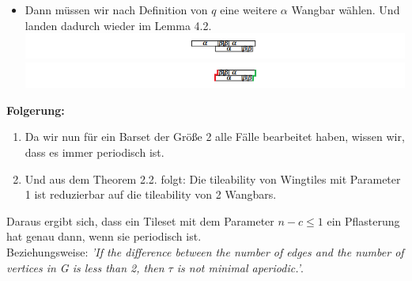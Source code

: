 \begin{itemize}
\begin{itemize}
        \item Dann müssen wir nach Definition von $q$ eine weitere $\alpha$ Wangbar wählen. Und landen dadurch wieder im Lemma 4.2.
        \\ \includegraphics[width=\textwidth]{src/pics/14.png}
        \\ \includegraphics[width=\textwidth]{src/pics/14_2.png}
        
    \end{itemize}
\end{itemize}


\textbf{Folgerung:}
\begin{enumerate}
    \item Da wir nun für ein Barset der Größe 2 alle Fälle bearbeitet haben, wissen wir, dass es immer periodisch ist.
    \item Und aus dem Theorem 2.2. folgt: Die tileability von Wingtiles mit Parameter 1 ist reduzierbar auf die tileability von 2 Wangbars.
\end{enumerate}

Daraus ergibt sich, dass ein Tileset mit dem Parameter $n-c \leq 1$ ein Pflasterung hat genau dann, wenn sie periodisch ist. 
\\Beziehungsweise: {\itshape'If the difference between the number of edges and the number of vertices in G is less than 2, then $\tau$ is not minimal aperiodic.'}.

